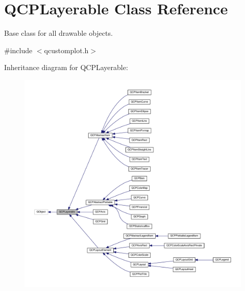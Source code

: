 \hypertarget{classQCPLayerable}{}\section{Q\+C\+P\+Layerable Class Reference}
\label{classQCPLayerable}


Base class for all drawable objects.  




{\ttfamily \#include $<$qcustomplot.\+h$>$}



Inheritance diagram for Q\+C\+P\+Layerable\+:
\nopagebreak
\begin{figure}[H]
\begin{center}
\leavevmode
\includegraphics[width=350pt]{classQCPLayerable__inherit__graph}
\end{center}
\end{figure}


